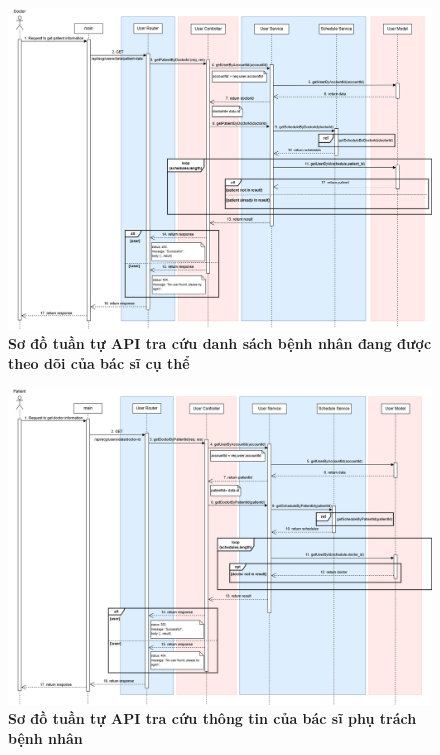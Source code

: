 \begin{figure}[H]
	\centering
	\includegraphics[width=16cm]{Images/api_sequence/user/getPatientByDoctorId.drawio.png}
	\caption[Sơ đồ tuần tự API tra cứu danh sách bệnh nhân đang được theo dõi của bác sĩ cụ thể]{\bfseries \fontsize{12pt}{0pt}\selectfont Sơ đồ tuần tự API tra cứu danh sách bệnh nhân đang được theo dõi của bác sĩ cụ thể}
	\label{sequence_diagram_get_patient_data}
\end{figure}

\begin{figure}[H]
	\centering
	\includegraphics[width=16cm]{Images/api_sequence/user/getDoctorByPatientId.drawio.png}
	\caption[Sơ đồ tuần tự API tra cứu thông tin của bác sĩ phụ trách bệnh nhân]{\bfseries \fontsize{12pt}{0pt}\selectfont Sơ đồ tuần tự API tra cứu thông tin của bác sĩ phụ trách bệnh nhân}
	\label{sequence_diagram_get_doctor_data}
\end{figure}


